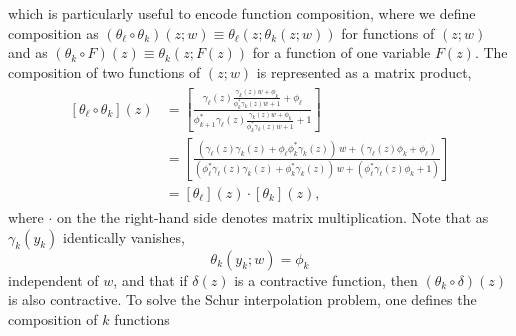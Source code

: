 which is particularly useful to encode function composition, where we define composition as $(\theta_\ell\circ\theta_k)(z; w)\equiv \theta_\ell(z; \theta_k(z; w))$ for functions of $(z; w)$ and as $(\theta_k\circ F)(z)\equiv \theta_k(z; F(z))$ for a function of one variable $F(z)$. The composition of two functions of $(z; w)$ is represented as a matrix product,
\begin{align} \begin{split}
    [\theta_{\ell}\circ \theta_{k}](z) &= \left[ \frac{\gamma_{\ell}(z) \frac{\gamma_k(z) w + \phi_k}{\phi_k^*\gamma_k(z) w + 1} + \phi_{\ell} }{\phi_{k + 1}^* \gamma_{\ell}(z) \frac{\gamma_k(z) w + \phi_k}{\phi_k^*\gamma_k(z) w + 1} + 1} \right] \\
    &= \left[\frac{(\gamma_{\ell}(z) \gamma_k(z) + \phi_{\ell} \phi_k^* \gamma_k(z) )\,w + (\gamma_{\ell}(z) \phi_k + \phi_{\ell} ) }{ (\phi_{\ell}^* \gamma_{\ell}(z) \gamma_k(z) + \phi_k^* \gamma_k(z) )\, w + (\phi_{\ell}^* \gamma_{\ell}(z) \phi_k + 1 ) }\right]
    \\
    &= [\theta_{\ell}](z) \cdot [\theta_k](z),
\end{split} \end{align}
where $\cdot$ on the the right-hand side denotes matrix multiplication. 
Note that as $\gamma_k(y_k)$ identically vanishes, 
\begin{equation}
    \theta_k(y_k; w) = \phi_k
\end{equation} 
independent of $w$, and that if $\delta(z)$ is a contractive function, then $(\theta_k\circ\delta)(z)$ is also contractive. To solve the Schur interpolation problem, one defines the composition of $k$ functions
